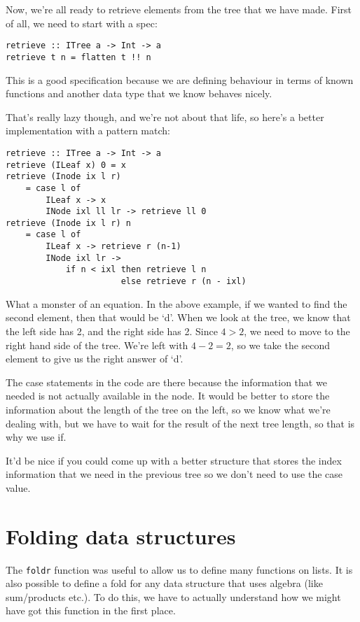 \documentclass[11pt,a4paper,titlepage]{scrartcl}
\begin{document}
Now, we're all ready to retrieve elements from the tree that we have made.
First of all, we need to start with a spec:
\begin{lstlisting}
retrieve :: ITree a -> Int -> a
retrieve t n = flatten t !! n
\end{lstlisting}
This is a good specification because we are defining behaviour in terms of
known functions and another data type that we know behaves nicely.

That's really lazy though, and we're not about that life, so here's a
better implementation with a pattern match:
\newpage
\begin{lstlisting}
retrieve :: ITree a -> Int -> a
retrieve (ILeaf x) 0 = x
retrieve (Inode ix l r)
    = case l of
        ILeaf x -> x
        INode ixl ll lr -> retrieve ll 0
retrieve (Inode ix l r) n
    = case l of
        ILeaf x -> retrieve r (n-1)
        INode ixl lr ->
            if n < ixl then retrieve l n
                       else retrieve r (n - ixl)
\end{lstlisting}

What a monster of an equation. In the above example, if we wanted to find
the second element, then that would be `d'. When we look at the tree, we
know that the left side has 2, and the right side has 2. Since $4 > 2$, we
need to move to the right hand side of the tree. We're left with $4 - 2 =
2$, so we take the second element to give us the right answer of `d'.

The case statements in the code are there because the information that we
needed is not actually available in the node. It would be better to store
the information about the length of the tree on the left, so we know what
we're dealing with, but we have to wait for the result of the next tree
length, so that is why we use if.

It'd be nice if you could come up with a better structure that stores the
index information that we need in the previous tree so we don't need to
use the case value.

\section{Folding data structures}%
\label{sec:folding}
The \lstinline|foldr| function was useful to allow us to define many
functions on lists. It is also possible to define a fold for any data
structure that uses algebra (like sum/products etc.). To do this, we have
to actually understand how we might have got this function in the first
place.
\end{document}
